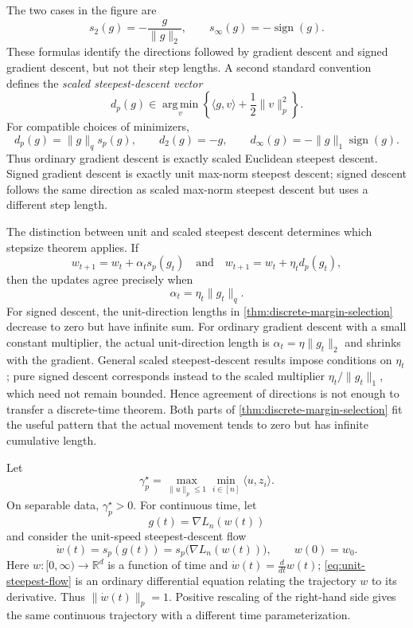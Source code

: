 \documentclass[11pt,twoside]{article}
\newcommand{\R}{\mathbb R}
\newcommand{\sign}{\operatorname{sign}}
\newcommand{\argmin}{\operatorname*{arg\,min}}
\theoremstyle{definition}
\theoremstyle{remark}
\begin{document}
The two cases in the figure are
\[
 s_2(g)=-\frac{g}{\|g\|_2},
 \qquad
 s_\infty(g)=-\sign(g).
\]
These formulas identify the directions followed by gradient descent and signed
gradient descent, but not their step lengths. A second standard convention
defines the \emph{scaled steepest-descent vector}
\begin{equation}
 d_p(g)\in\argmin_v
 \left\{\langle g,v\rangle+\frac12\|v\|_p^2\right\}.
 \label{eq:scaled-steepest-vector}
\end{equation}
For compatible choices of minimizers,
\[
 d_p(g)=\|g\|_q s_p(g),
 \qquad d_2(g)=-g,
 \qquad d_\infty(g)=-\|g\|_1\sign(g).
\]
Thus ordinary gradient descent is exactly scaled Euclidean steepest descent.
Signed gradient descent is exactly unit max-norm steepest descent; signed
descent follows the same direction as scaled max-norm steepest descent but
uses a different step length.

The distinction between unit and scaled steepest descent determines which
stepsize theorem applies. If
\[
 w_{t+1}=w_t+\alpha_t s_p(g_t)
 \quad\text{and}\quad
 w_{t+1}=w_t+\eta_t d_p(g_t),
\]
then the updates agree precisely when
\begin{equation}
 \alpha_t=\eta_t\|g_t\|_q.
 \label{eq:unit-scaled-steps}
\end{equation}
For signed descent, the unit-direction lengths in
\cref{thm:discrete-margin-selection} decrease to zero but have infinite sum.
For ordinary gradient descent with a small constant multiplier, the actual
unit-direction length is $\alpha_t=\eta\|g_t\|_2$ and shrinks with the
gradient. General scaled steepest-descent results impose conditions on
$\eta_t$; pure signed descent corresponds instead to the scaled multiplier
$\eta_t/\|g_t\|_1$, which need not remain bounded. Hence agreement of
directions is not enough to transfer a discrete-time theorem. Both parts of
\cref{thm:discrete-margin-selection} fit the useful pattern that the actual
movement tends to zero but has infinite cumulative length.

Let
\[
 \gamma_p^\star=\max_{\|u\|_p\le1}
                 \min_{i\in[n]}\langle u,z_i\rangle.
\]
On separable data, $\gamma_p^\star>0$. For continuous time, let
\[
 g(t)=\nabla L_n(w(t))
\]
and consider the unit-speed steepest-descent flow
\begin{equation}
 \dot w(t)=s_p(g(t))
 =s_p\bigl(\nabla L_n(w(t))\bigr),
 \qquad w(0)=w_0.
 \label{eq:unit-steepest-flow}
\end{equation}
Here $w:[0,\infty)\to\R^d$ is a function of time and
$\dot w(t)=\frac{d}{dt}w(t)$; \cref{eq:unit-steepest-flow} is an ordinary
differential equation relating the trajectory $w$ to its derivative. Thus
$\|\dot w(t)\|_p=1$. Positive rescaling of the right-hand side gives the same
continuous trajectory with a different time parameterization.
\end{document}
